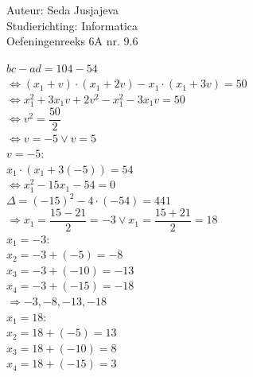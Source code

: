 \documentclass[a4paper]{article}
\begin{document}
\noindent \large Auteur: Seda Jusjajeva\\
\noindent \large Studierichting: Informatica\\
\noindent \large Oefeningenreeks 6A nr. 9.6\\

\medskip

\normalsize



$bc - ad = 104 - 54$ \\

$\Leftrightarrow (x_1 + v)\cdot (x_1 + 2v) - x_1\cdot (x_1 + 3v) = 50$ \\

$\Leftrightarrow x_1^2 + 3x_1v + 2v^2 - x_1^2 - 3x_1v = 50$ \\

$\Leftrightarrow v^2 = \dfrac{50}{2}$ \\

$\Leftrightarrow v = -5 \vee v = 5$ \\

$v = -5$: \\

$x_1\cdot (x_1 + 3(-5)) = 54$ \\

$\Leftrightarrow x_1^2 - 15x_1 - 54 = 0$ \\

$\Delta = (-15)^2-4\cdot(-54) = 441$ \\

$\Rightarrow x_1 = \dfrac{15 - 21}{2} = -3 \vee x_1 = \dfrac{15 + 21}{2} = 18$ \\

$x_1 = -3$: \\

$x_2 = -3 + (-5) = -8$ \\

$x_3 = -3 + (-10) = -13$ \\

$x_4 = -3 + (-15) = -18$ \\

$\Rightarrow -3 , -8, -13, -18$ \\

$x_1 = 18$: \\

$x_2 = 18 + (-5) = 13$ \\

$x_3 = 18 + (-10) = 8$ \\

$x_4 = 18 + (-15) = 3$ \\
\end{document}
